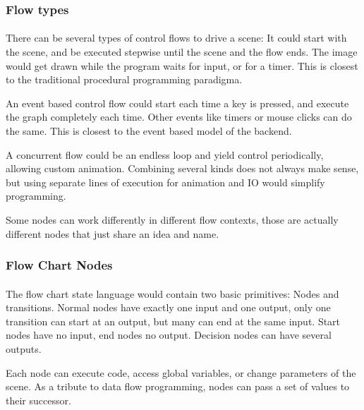 \subsubsection{Flow types}
\paragraph{}
There can be several types of control flows to drive a scene:
It could start with the scene, and be executed stepwise until the scene and the flow ends.
The image would get drawn while the program waits for input, or for a timer.
This is closest to the traditional procedural programming paradigma.

An event based control flow could start each time a key is pressed, and execute the graph completely each time.
Other events like timers or mouse clicks can do the same.
This is closest to the event based model of the backend.

A concurrent flow could be an endless loop and yield control periodically, allowing custom animation.
Combining several kinds does not always make sense, but using separate lines of execution for animation and IO would simplify programming.

Some nodes can work differently in different flow contexts, those are actually different nodes that just share an idea and name.

\subsubsection{Flow Chart Nodes}
\paragraph{}
The flow chart state language would contain two basic primitives: Nodes and transitions.
Normal nodes have exactly one input and one output, only one transition can start at an output, but many can end at the same input. Start nodes have no input, end nodes no output. Decision nodes can have several outputs.

Each node can  execute code, access global variables, or change parameters of the scene.
As a tribute to data flow programming, nodes can pass a set of values to their successor.

